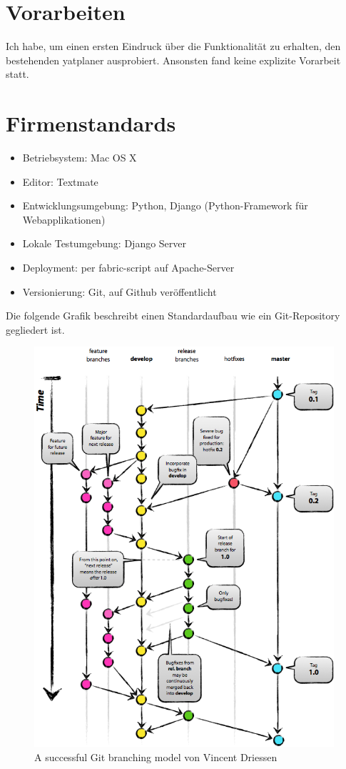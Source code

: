 \section{Vorarbeiten}
Ich habe, um einen ersten Eindruck über die Funktionalität zu erhalten, den bestehenden yatplaner ausprobiert.
Ansonsten fand keine explizite Vorarbeit statt.

\section{Firmenstandards}
\begin{itemize}
    \item Betriebsystem: Mac OS X
    \item Editor: Textmate
    \item Entwicklungsumgebung: Python, Django (Python-Framework für Webapplikationen)
    \item Lokale Testumgebung: Django Server
    \item Deployment: per fabric-script auf Apache-Server
    \item Versionierung: Git, auf Github veröffentlicht
\end{itemize}
Die folgende Grafik beschreibt einen Standardaufbau wie ein Git-Repository gegliedert ist.
    \begin{figure}[!ht]
    \begin{center}
    \includegraphics[width=0.99\textwidth,angle=0]{./bilder/git.png}
    \caption{A successful Git branching model von Vincent Driessen}
    \end{center}
    \end{figure}

